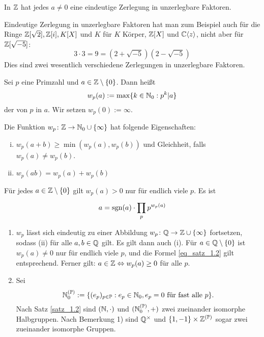 	In $\mathbb{Z}$ hat jedes $a \neq 0$ eine eindeutige Zerlegung in unzerlegbare Faktoren. 

	Eindeutige Zerlegung in unzerlegbare Faktoren hat man zum Beispiel auch für die Ringe $\mathbb{Z}[\sqrt{2}], \mathbb{Z}[i], K[X]$ und $K$ für $K$ Körper, $\mathbb{Z}[X]$ und $\mathbb{C}\langle z\rangle$, nicht aber für $\mathbb{Z}[\sqrt{-5}]$:
	\[ 3 \cdot 3 = 9 = (2+ \sqrt{-5})(2 - \sqrt{-5}) \]
	Dies sind zwei wesentlich verschiedene Zerlegungen in unzerlegbare Faktoren.

\begin{defn}[Exponent] \label{def_1.7}
	Sei $p$ eine Primzahl und $a \in \mathbb{Z} \setminus \{0\}$. Dann heißt
	\[ w_p(a) :=\max\{k \in \mathbb{N}_0 : p^k |a \} \]
	der  von $p$ in $a$. Wir setzen $w_p(0) := \infty$.
\end{defn}

\begin{falko} \label{F1.6}
	Die Funktion $w_p \colon \mathbb{Z} \rightarrow \mathbb{N}_0 \cup \{\infty\}$ hat folgende Eigenschaften:
	\begin{enumerate}[(i)]
		\item $w_p(a+b) \geq \min(w_p(a),w_p(b))$ und Gleichheit, falls $w_p(a) \neq w_p(b)$.
		\item $w_p(ab) = w_p(a) + w_p(b)$
	\end{enumerate}
\end{falko}

\begin{satz} \label{satz_1.2}
	Für jedes $a \in \mathbb{Z} \setminus \{0\}$ gilt $w_p(a) > 0$ nur für endlich viele $p$. Es ist
	\begin{equation}
		a = \operatorname{sgn}(a) \cdot \prod\limits_p^{} p^{w_p(a)} \label{eq_satz_1.2}
	\end{equation}
\end{satz}

	\begin{enumerate}[1)]
		\item $w_p$ lässt sich eindeutig zu einer Abbildung $w_p \colon \mathbb{Q} \rightarrow \mathbb{Z} \cup \{\infty\}$ fortsetzen, sodass (ii) für alle $a,b \in \mathbb{Q}$ gilt. Es gilt dann auch (i). Für $a \in \mathbb{Q} \setminus \{0\}$ ist $w_p(a) \neq 0$ nur für endlich viele $p$, und die Formel \eqref{eq_satz_1.2} gilt entsprechend.  Ferner gilt: $a \in \mathbb{Z} \Leftrightarrow w_p(a) \geq 0$ für alle $p$.
		\item Sei
		\[ \mathbb{N}_0^{(\mathbb{P})} := \{ (e_p)_{p \in \mathbb{P}} : e_p \in \mathbb{N}_0, e_p = 0 \text{ für fast alle } p \}. \]
		Nach Satz \ref{satz_1.2} sind $(\mathbb{N},\cdot)$ und $(\mathbb{N}_0^{(\mathbb{P})},+)$ zwei zueinander isomorphe Halbgruppen. Nach Bemerkung 1) sind $\mathbb{Q}^\times$ und $\{1,-1\} \times \mathbb{Z}^{(\mathbb{P})}$ sogar zwei zueinander isomorphe Gruppen.
	\end{enumerate}
	
